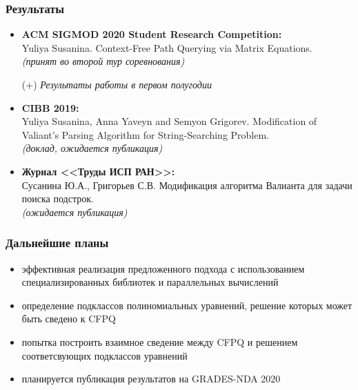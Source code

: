 \documentclass[xcolor=table]{beamer}
\begin{document}
\begin{frame}[fragile]
  \transwipe[direction=90]
  \frametitle{Результаты}
  
\begin{itemize}

  \item \textbf{ACM SIGMOD 2020 Student Research Competition:} \\ 
  Yuliya Susanina. Context-Free Path Querying via Matrix Equations.\\
  \textit{(принят во второй тур соревнования)}
  
\vspace{10pt}\hspace{-30pt} (+) \textit{Результаты работы в первом полугодии}
  
  \item \textbf{CIBB 2019:} \\
  Yuliya Susanina, Anna Yaveyn and Semyon Grigorev. Modification of Valiant’s Parsing Algorithm for String-Searching Problem. \\
  \textit{(доклад, ожидается публикация)}
  \item \textbf{Журнал <<Труды ИСП РАН>>:} \\
  Сусанина Ю.А., Григорьев С.В. Модификация алгоритма Валианта для задачи поиска подстрок. \\
  \textit{(ожидается публикация)}
  
\end{itemize}

\end{frame}




\begin{frame}[fragile]
  \transwipe[direction=90]
  \frametitle{Дальнейшие планы}

\begin{itemize}
    \item эффективная реализация предложенного подхода с использованием специализированных библиотек и параллельных вычислений
    \item определение подклассов полиномиальных уравнений, решение которых может быть сведено к CFPQ
    \item попытка построить взаимное сведение между CFPQ и решением соответсвующих подклассов уравнений
    \item планируется публикация результатов на GRADES-NDA 2020
\end{itemize}

\end{frame}
\end{document}
